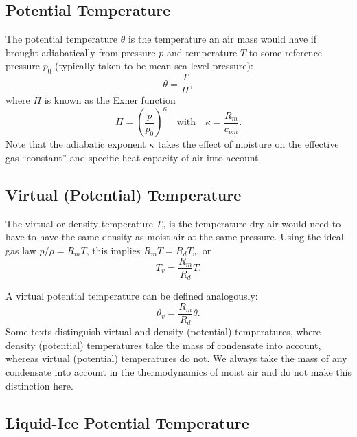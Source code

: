 \documentclass{report}
\begin{document}
\subsection{Potential Temperature} The potential temperature $\theta$ is the temperature an air mass would have if brought adiabatically from pressure $p$ and temperature $T$ to some reference pressure $p_0$ (typically taken to be mean sea level pressure):
\begin{equation}\label{e:pot_temp_press_T}
\theta = \frac{T}{\Pi},  
\end{equation}
where $\Pi$ is known as the Exner function
\begin{equation}
    \Pi  = \left( \frac{p}{p_0} \right)^\kappa \quad \text{with} \quad \kappa = \frac{R_m}{c_{pm}}.
\end{equation}
Note that the adiabatic exponent $\kappa$ takes the effect of  moisture on the effective gas ``constant'' and specific heat capacity of air into account.

\subsection{Virtual (Potential) Temperature}\label{s:virtual_temp} The virtual or density temperature $T_v$ is the temperature dry air would need to have to have the same density as moist air at the same pressure. Using the ideal gas law $p/\rho = R_m T$, this implies $R_m T  = R_d T_v $, or
\begin{equation}\label{e:virtual_temp}
T_v = \frac{R_m}{R_d} T.
\end{equation}

A virtual potential temperature can be defined analogously:
\begin{equation}\label{e:virtual_pottemp}
\theta_v = \frac{R_m}{R_d} \theta.
\end{equation}
Some texts distinguish virtual and density (potential) temperatures, where density (potential) temperatures take the mass of condensate into account, whereas virtual (potential) temperatures do not. We always take the mass of any condensate into account in the thermodynamics of moist air and do not make this distinction here. 

\subsection{Liquid-Ice Potential Temperature}
\end{document}
